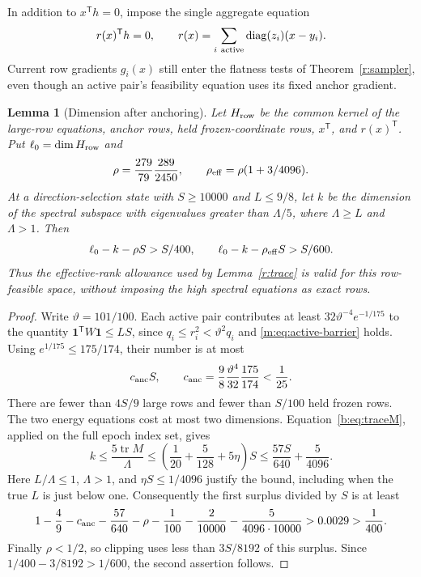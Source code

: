 \documentclass[11pt]{amsart}
\newtheorem{lemma}[theorem]{Lemma}
\theoremstyle{definition}\newtheorem{definition}[theorem]{Definition}
\theoremstyle{remark}\newtheorem{remark}[theorem]{Remark}
\numberwithin{equation}{section}
\begin{document}
In addition to $x^{\mathsf T}h=0$, impose the single aggregate equation
\begin{equation}
 r(x)^{\mathsf T}h=0,\qquad
 r(x)=\sum_{i\ {\rm active}}\operatorname{diag}(z_i)(x-y_i).
                                                               \label{m:eq:aggregate}
\end{equation}
Current row gradients $g_i(x)$ still enter the flatness tests of
Theorem~\ref{r:sampler}, even though an active pair's feasibility equation
uses its fixed anchor gradient.

\begin{lemma}[Dimension after anchoring]\label{m:lem:dimension}
Let $H_{\rm row}$ be the common kernel of the large-row equations, anchor
rows, held frozen-coordinate rows, $x^{\mathsf T}$, and
$r(x)^{\mathsf T}$. Put $\ell_0=\dim H_{\rm row}$ and
\[
 \rho=\frac{279}{79}\frac{289}{2450},\qquad
 \rho_{\rm eff}=\rho(1+3/4096).
\]
At a direction-selection state with $S\ge10000$ and $L\le9/8$, let $k$
be the dimension of the spectral subspace with eigenvalues greater than
$\Lambda/5$, where $\Lambda\ge L$ and $\Lambda>1$. Then
\begin{equation}
              \ell_0-k-\rho S>S/400,
 \qquad       \ell_0-k-\rho_{\rm eff}S>S/600.               \label{m:eq:dimension}
\end{equation}
Thus the effective-rank allowance used by Lemma~\ref{r:trace} is valid
for this row-feasible space, without imposing the high spectral equations
as exact rows.
\end{lemma}
\begin{proof}
Write $\vartheta=101/100$. Each active pair contributes at least
$32\vartheta^{-4}e^{-1/175}$ to the quantity
$\mathbf1^{\mathsf T}W\mathbf1\le LS$, since
$q_i\le r_i^2<\vartheta^2q_i$ and \eqref{m:eq:active-barrier} holds.
Using $e^{1/175}\le175/174$, their number is at most
\begin{equation}
 c_{\rm anc}S,\qquad
 c_{\rm anc}=\frac98\frac{\vartheta^4}{32}\frac{175}{174}
                         <\frac1{25}.                    \label{m:eq:anchor-count}
\end{equation}
There are fewer than $4S/9$ large rows and fewer than $S/100$ held frozen
rows. The two energy equations cost at most two dimensions.
Equation~\eqref{b:eq:traceM}, applied on the full epoch index set, gives
\[
 k\le\frac{5\operatorname{tr}M}{\Lambda}
 \le\left(\frac1{20}+\frac5{128}+5\eta\right)S
 \le\frac{57S}{640}+\frac5{4096}.
\]
Here $L/\Lambda\le1$, $\Lambda>1$, and $\eta S\le1/4096$
justify the bound, including when the true $L$ is just below one.
Consequently the first surplus divided by $S$ is at least
\[
 1-\frac49-c_{\rm anc}-\frac{57}{640}-\rho-\frac1{100}
   -\frac2{10000}-\frac5{4096\cdot10000}>0.0029>\frac1{400}.
\]
Finally $\rho<1/2$, so clipping uses less than $3S/8192$ of this
surplus. Since $1/400-3/8192>1/600$, the second assertion follows.
\end{proof}
\end{document}
